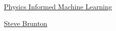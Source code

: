 \documentclass[11pt]{article}
\begin{document}
	\kaishu 
	\setcounter{section}{0}
	\begin{center}
		{\LARGE  \href{https://www.youtube.com/playlist?list=PLMrJAkhIeNNQ0BaKuBKY43k4xMo6NSbBa}{Physics Informed Machine Learning}}
		
		
		{\large \href{https://www.eigensteve.com/people}{Steve Brunton}}
	\end{center}
\setcounter{page}{1}



\vspace{-1cm}
\end{document}
